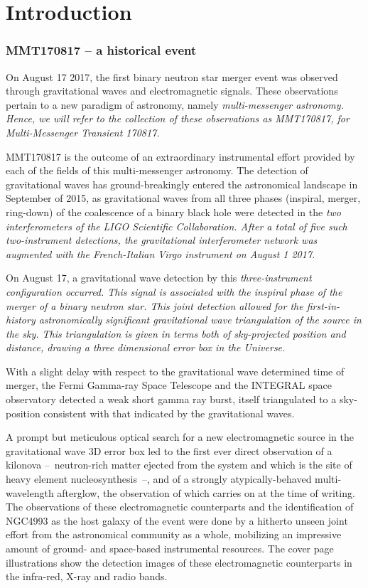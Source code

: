 \part{Introduction}

\section{MMT170817 -- a historical event}
On August 17 2017, the first binary neutron star merger event was observed through gravitational waves and electromagnetic signals. These observations pertain to a new paradigm of astronomy, namely \it{multi-messenger astronomy}. Hence, we will refer to the collection of these observations as MMT170817, for \it{Multi-Messenger Transient 170817}.

MMT170817 is the outcome of an extraordinary instrumental effort provided by each of the fields of this multi-messenger astronomy. The detection of gravitational waves has ground-breakingly entered the astronomical landscape in September of 2015, as gravitational waves from all three phases (inspiral, merger, ring-down) of the coalescence of a binary black hole were detected in the \it{two} interferometers of the LIGO Scientific Collaboration. After a total of five such two-instrument detections, the gravitational interferometer network was augmented with the French-Italian Virgo instrument on August 1 2017.

On August 17, a gravitational wave detection by this \it{three}-instrument configuration occurred. This signal is associated with the inspiral phase of the merger of a binary neutron star. This joint detection allowed for the first-in-history astronomically significant gravitational wave triangulation of the source in the sky. This triangulation is given in terms both of sky-projected position and distance, drawing a three dimensional error box in the Universe.

With a slight delay with respect to the gravitational wave determined time of merger, the Fermi Gamma-ray Space Telescope and the INTEGRAL space observatory detected a weak short gamma ray burst, itself triangulated to a sky-position consistent with that indicated by the gravitational waves.

A prompt but meticulous optical search for a new electromagnetic source in the gravitational wave 3D error box led to the first ever direct observation of a kilonova --~neutron-rich matter ejected from the system and which is the site of heavy element nucleosynthesis~--, and of a strongly atypically-behaved multi-wavelength afterglow, the observation of which carries on at the time of writing. The observations of these electromagnetic counterparts and the identification of NGC4993 as the host galaxy of the event were done by a hitherto unseen joint effort from the astronomical community as a whole, mobilizing an impressive amount of ground- and space-based instrumental resources. The cover page illustrations show the detection images of these electromagnetic counterparts in the infra-red, X-ray and radio bands.

